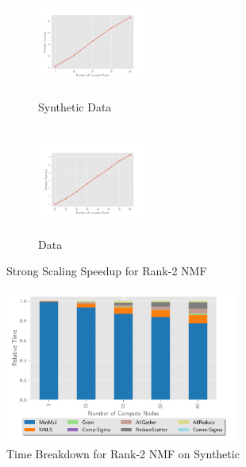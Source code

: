 \begin{figure}
\centering
\begin{subfigure}{1.5in}
\begin{center}
\includegraphics[height=1.4in, width=1.4in]{plots/synthetic_rank2_speedup.pdf}
\caption{Synthetic Data}
\label{fig:synrank2speedup}
\end{center}
\end{subfigure}
\begin{subfigure}{1.5in}
\begin{center}
\includegraphics[height=1.4in, width=1.4in]{plots/realworld_rank2_speedup.pdf}
\caption{\image{} Data}
\label{fig:rwrank2speedup}
\end{center}
\end{subfigure}
\caption{Strong Scaling Speedup for Rank-2 NMF}
\label{fig:rank2speedup}
\end{figure}


\begin{figure}
\begin{center}
\includegraphics[height=2in, width=\columnwidth]{plots/synthetic_rank2_strongscaling.pdf}
\caption{Time Breakdown for Rank-2 NMF on Synthetic}
\label{fig:synrank2strongscaling}
\end{center}
\end{figure}

